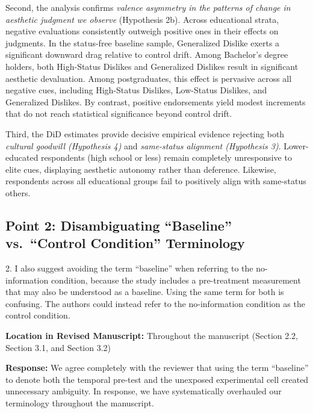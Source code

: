 \documentclass[11pt, letterpaper]{article}
\begin{document}
Second, the analysis confirms \textit{valence asymmetry in the patterns of change in aesthetic judgment we observe} (Hypothesis 2b). Across educational strata, negative evaluations consistently outweigh positive ones in their effects on judgments. In the status-free baseline sample, Generalized Dislike exerts a significant downward drag relative to control drift. Among Bachelor's degree holders, both High-Status Dislikes and Generalized Dislikes result in significant aesthetic devaluation. Among postgraduates, this effect is pervasive across all negative cues, including High-Status Dislikes, Low-Status Dislikes, and Generalized Dislikes. By contrast, positive endorsements yield modest increments that do not reach statistical significance beyond control drift. 

Third, the DiD estimates provide decisive empirical evidence rejecting both \textit{cultural goodwill (Hypothesis 4)} and \textit{same-status alignment (Hypothesis 3)}. Lower-educated respondents (high school or less) remain completely unresponsive to elite cues, displaying aesthetic autonomy rather than deference. Likewise, respondents across all educational groups fail to positively align with same-status others.

\subsection*{Point 2: Disambiguating ``Baseline'' vs.~``Control Condition'' Terminology}

\begin{reviewercomment}
2. I also suggest avoiding the term ``baseline'' when referring to the no-information condition, because the study includes a pre-treatment measurement that may also be understood as a baseline. Using the same term for both is confusing. The authors could instead refer to the no-information condition as the control condition.
\end{reviewercomment}

\textbf{Location in Revised Manuscript:} Throughout the manuscript (Section 2.2, Section 3.1, and Section 3.2)

\textbf{Response:}
We agree completely with the reviewer that using the term ``baseline'' to denote both the temporal pre-test and the unexposed experimental cell created unnecessary ambiguity. In response, we have systematically overhauled our terminology throughout the manuscript.
\end{document}
